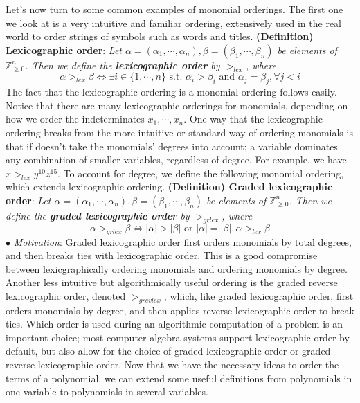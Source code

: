 \documentclass{article}
\begin{document}
Let's now turn to some common examples of monomial orderings. The first one we look at is a very intuitive and familiar ordering, extensively used in the real world to order strings of symbols such as words and titles.
\newline \newline
\textbf{(Definition) Lexicographic order}: \textit{Let $ \alpha = (\alpha_1, \cdots, \alpha_n), \beta = (\beta_1, \cdots, \beta_n) $ be elements of $ \mathbb{Z}_{\geq 0}^n $. Then we define the \textbf{lexicographic order} by $ >_{lex} $, where}
$$ \alpha >_{lex} \beta \iff \exists i \in \{1, \cdots, n \} \text{ s.t. } \alpha_i > \beta_i \text{ and } \alpha_j = \beta_j, \forall j < i $$
\newline
The fact that the lexicographic ordering is a monomial ordering follows easily. Notice that there are many lexicographic orderings for monomials, depending on how we order the indeterminates $ x_1, \cdots, x_n $.
\newline
One way that the lexicographic ordering breaks from the more intuitive or standard way of ordering monomials is that if doesn't take the monomials' degrees into account; a variable dominates any combination of smaller variables, regardless of degree. For example, we have $ x >_{lex} y^{10} z^{15} $. To account for degree, we define the following monomial ordering, which extends lexicographic ordering.
\newline \newline
\textbf{(Definition) Graded lexicographic order}: \textit{Let $ \alpha = (\alpha_1, \cdots, \alpha_n), \beta = (\beta_1, \cdots, \beta_n) $ be elements of $ \mathbb{Z}_{\geq 0}^n $. Then we define the \textbf{graded lexicographic order} by $ >_{grlex} $, where}
$$ \alpha >_{grlex} \beta \iff |\alpha| > |\beta| \text{ or } |\alpha| = |\beta|, \alpha >_{lex} \beta $$
\newline
\indent $ \bullet $ \textit{Motivation}: Graded lexicographic order first orders monomials by total degrees, and then breaks ties with lexicographic order. This is a good compromise between lexicgraphically ordering monomials and ordering monomials by degree.
\newline
Another less intuitive but algorithmically useful ordering is the graded reverse lexicographic order, denoted $ >_{grevlex} $, which, like graded lexicographic order, first orders monomials by degree, and then applies reverse lexicographic order to break ties.
\newline
Which order is used during an algorithmic computation of a problem is an important choice; most computer algebra systems support lexicographic order by default, but also allow for the choice of graded lexicographic order or graded reverse lexicographic order. Now that we have the necessary ideas to order the terms of a polynomial, we can extend some useful definitions from polynomials in one variable to polynomials in several variables.
\end{document}
